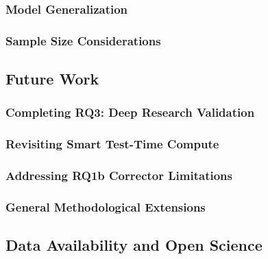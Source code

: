 \subsubsection{Model Generalization}

\subsubsection{Sample Size Considerations}

\subsection{Future Work}
\label{sec:discussion_future}

\subsubsection{Completing RQ3: Deep Research Validation}

\subsubsection{Revisiting Smart Test-Time Compute}

\subsubsection{Addressing RQ1b Corrector Limitations}

\subsubsection{General Methodological Extensions}

\subsection{Data Availability and Open Science}
\label{sec:discussion_data}

